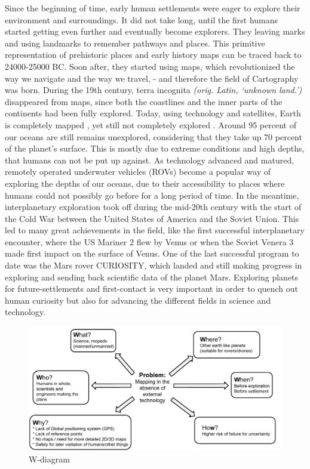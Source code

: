 Since the beginning of time, early human settlements were eager to explore their environment and surroundings. It did not take long, until the first humans started getting even further and eventually become explorers. They leaving marks and using landmarks to remember pathways and places. This primitive representation of prehistoric places and early history maps can be traced back to 24000-25000 BC\cite{cavedrawings}. Soon after, they started using maps, which revolutionized the way we navigate and the way we travel, - and therefore the field of Cartography was born. During the 19th century, terra incognita \textit{(orig. Latin, ‘unknown land.’)} disappeared from maps, since both the coastlines and the inner parts of the continents had been fully explored. Today, using technology and satellites, Earth is completely mapped %
, yet still not completely explored %
. Around 95 percent of our oceans are still remains unexplored, considering that they take up 70 percent of the planet's surface\cite{oceandepth}. This is mostly due to extreme conditions and high depths, that humans can not be put up against. As technology advanced and matured, remotely operated underwater vehicles (ROVs) become a popular way of exploring the depths of our oceans, due to their accessibility to places where humans could not possibly go before for a long period of time. In the meantime, interplanetary exploration took off during the mid-20th century with the start of the Cold War between the United States of America and the Soviet Union. This led to many great achievements in the field, like the first successful interplanetary encounter, where the US Mariner 2 flew by Venus\cite{firstflyby} or when the Soviet Venera 3 made first impact on the surface of Venus\cite{firstimpact}. One of the last successful program to date was the Mars rover CURIOSITY, which landed and still making progress in exploring and sending back scientific data of the planet Mars. Exploring planets for future-settlements and first-contact is very important in order to quench out human curiosity but also for advancing the different fields in science and technology.

\clearpage

\begin{figure}[!h]
	\centering
	\includegraphics[scale=.7]{images/wdiagram1.pdf}
	\caption{W-diagram}
	\label{fig:wdiagram}
\end{figure}

